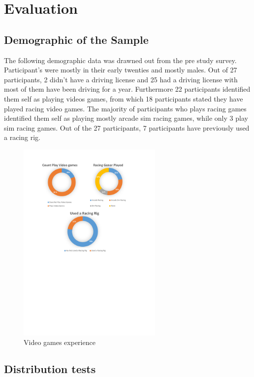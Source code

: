 \section{Evaluation}
%
%

\subsection{Demographic of the Sample}

The following demographic data was drawned out from the pre study survey. Participant's were mostly in their early twenties and mostly males. Out of 27 participants, 2 didn't have a driving license and 25 had a driving license with most of them have been driving for a year. Furthermore 22 participants identified them self as playing videos games, from which 18 participants stated they have played racing video games. The majority of participants who plays racing games identified them self as playing mostly arcade sim racing games, while only 3 play sim racing games. Out of the 27 participants, 7 participants have previously used a racing rig.


\begin{figure}[!htb]
	\centering
	\includegraphics[height=10cm]{charts/gamesxp.pdf}
	\caption[Gaming xp]{Video games experience}
	\label{fig:chart-gamesxp}
\end{figure}

\subsection{Distribution tests}

